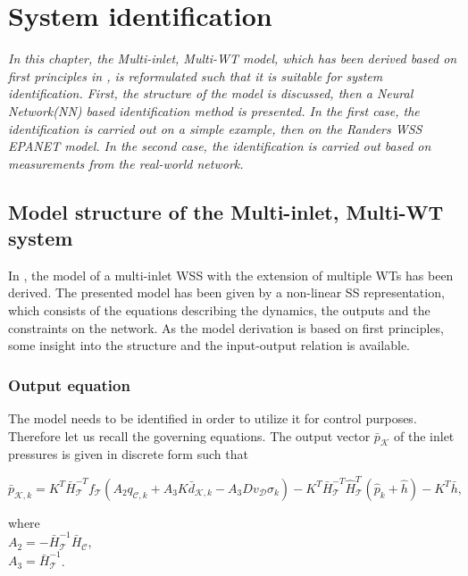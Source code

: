 \chapter{System identification}
\label{identification_design}

\emph{In this chapter, the Multi-inlet, Multi-WT model, which has been derived based on first principles in , is reformulated such that it is suitable for system identification. First, the structure of the model is discussed, then a Neural Network(NN) based identification method is presented. In the first case, the identification is carried out on a simple example, then on the Randers WSS EPANET model. In the second case, the identification is carried out based on measurements from the real-world network.}

\section{Model structure of the Multi-inlet, Multi-WT system}
\label{model_structure_of_the_multi_inlet_multi_WT_system}

In , the model of a multi-inlet WSS with the extension of multiple WTs has been derived. The presented model has been given by a non-linear SS representation, which consists of the equations describing the dynamics, the outputs and the constraints on the network. As the model derivation is based on first principles, some insight into the structure and the input-output relation is available. 

\subsection{Output equation}
\label{output_eq_identification}

The model needs to be identified in order to utilize it for control purposes. Therefore let us recall the governing equations. The output vector $\bar{p}_{\mathcal{K}}$ of the inlet pressures is given in discrete form such that

\begin{equation}
  \label{recall_output_eq}
  \bar{p}_{\mathcal{K},k} = K^T \bar{H}^{-T}_{\mathcal{T}}f_{\mathcal{T}}(A_2 q_{\mathcal{C},k} + A_3 K \bar{d}_{\mathcal{K},k} - A_3 D v_{\mathcal{D}} \sigma_k) - K^T\bar{H}^{-T}_{\mathcal{T}}\hat{H}^{T}_{\mathcal{T}} (\hat{p}_k + \hat{h}) - K^T\bar{h} ,
\end{equation} 

\begin{minipage}[t]{0.4\textwidth}
where\\
\hspace*{8mm} $A_2 = -\bar{H}^{-1}_{\mathcal{T}} \bar{H}_{\mathcal{C}} $, \vspace*{1.5mm}\\
\hspace*{8mm} $A_3 = \bar{H}^{-1}_{\mathcal{T}}$.
\end{minipage}

